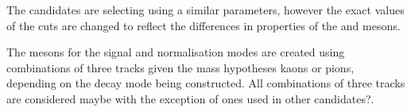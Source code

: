The \Dzb candidates are selecting using a similar parameters, however the exact values of the cuts are changed to reflect the differences in properties of the \phiz and \Dzb mesons.





The \Dsp mesons for the signal and normalisation modes are created using combinations of three tracks given the mass hypotheses kaons or pions, depending on the decay mode being constructed. All combinations of three tracks are considered {\color{red} maybe with the exception of ones used in other candidates?}. 





